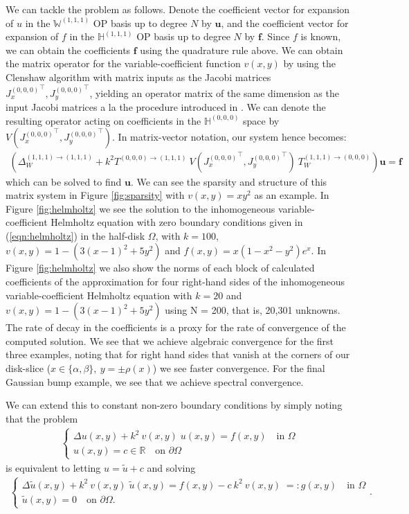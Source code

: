 \documentclass[11pt, oneside]{article}   	%
\newcommand{\R}{\mathbb{R}}
\newcommand{\hdop}{H}
\newcommand{\bighdopiii}{{\mathbb{\hdop}^{(1,1,1)}}}
\newcommand{\bighdopooo}{{\mathbb{\hdop}^{(0,0,0)}}}
\newcommand{\laplacewiii}{\Delta_W^{(1,1,1)\to(1,1,1)}}
\newcommand{\bigWiii}{{\mathbb{W}^{(1,1,1)}}}
\begin{document}
We can tackle the problem as follows. Denote the coefficient vector for expansion of $u$ in the $\bigWiii$ OP basis up to degree $N$ by $\mathbf{u}$, and the coefficient vector for expansion of $f$ in the $\bighdopiii$ OP basis up to degree $N$ by $\mathbf{f}$. Since $f$ is known, we can obtain  the coefficients $\mathbf{f}$ using the quadrature rule above. We can obtain the matrix operator for the variable-coefficient function $v(x,y)$ by using the Clenshaw algorithm with matrix inputs as the Jacobi matrices ${J_x^{(0,0,0)}}^\top, {J_y^{(0,0,0)}}^\top$, yielding an operator matrix of the same dimension as the input Jacobi matrices a la the procedure introduced in \cite{olver2019triangle}. We can denote the resulting operator acting on coefficients in the $\bighdopooo$ space by $V({J_x^{(0,0,0)}}^\top, {J_y^{(0,0,0)}}^\top)$. In matrix-vector notation, our system hence becomes:
\begin{align*}
    (\laplacewiii + k^2 T^{(0,0,0)\to(1,1,1)} \: V({J_x^{(0,0,0)}}^\top, {J_y^{(0,0,0)}}^\top) \: T_W^{(1,1,1)\to(0,0,0)}) \mathbf{u} = \mathbf{f}
\end{align*}
which can be solved to find $\mathbf{u}$. We can see the sparsity and structure of this matrix system in Figure \ref{fig:sparsity} with $v(x,y) = xy^2$ as an example. In Figure \ref{fig:helmholtz} we see the solution to the inhomogeneous variable-coefficient Helmholtz equation with zero boundary conditions given in (\ref{eqn:helmholtz}) in the half-disk $\Omega$, with $k=100$, $v(x,y) = 1 - (3(x-1)^2 + 5y^2)$ and $f(x,y) = x(1-x^2-y^2)e^x$. In Figure \ref{fig:helmholtz} we also show the norms of each block of calculated coefficients of the approximation for four right-hand sides of the inhomogeneous variable-coefficient Helmholtz equation with $k=20$ and $v(x,y) = 1 - (3(x-1)^2 + 5y^2)$ using N = 200, that is, 20,301 unknowns. The rate of decay in the coefficients is a proxy for the rate of convergence of the computed solution. We see that we achieve algebraic convergence for the first three examples, noting that for right hand sides that vanish at the corners of our disk-slice ($x\in\{\alpha,\beta\}, \: y = \pm \rho(x)$) we see faster convergence. For the final Gaussian bump example, we see that we achieve spectral convergence.

We can extend this to constant non-zero boundary conditions by simply noting that the problem 
\begin{align*}
	\begin{cases}
    		\Delta u(x,y) + k^2 \: v(x,y) \; u(x,y) = f(x,y) \quad \text{in } \Omega \\
		u(x,y) = c \in \R \quad \text{on } \partial \Omega
	\end{cases}
\end{align*}
is equivalent to letting $u = \tilde{u} + c$ and solving
\begin{align*}
	\begin{cases}
    		\Delta \tilde{u}(x,y) + k^2 \: v(x,y) \; \tilde{u}(x,y) = f(x,y) - c \: k^2 \: v(x,y) \; =: g(x,y)  \quad \text{in } \Omega \\
		\tilde{u}(x,y) = 0 \quad \text{on } \partial \Omega.
	\end{cases}.
\end{align*}
\end{document}
